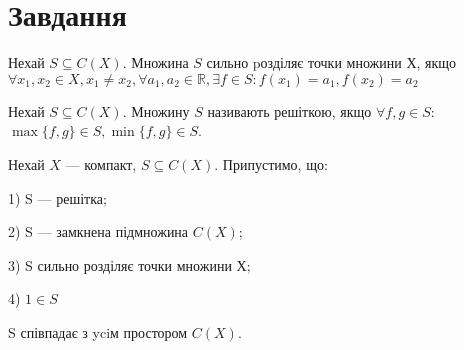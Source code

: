 \chapter{Завдання \theHchapter}

\begin{tcolorbox}[title=Означення 1]
    Нехай $S \subseteq C(X)$. 
    Множина $S$ сильно pозділяє точки множини $Х$, якщо
    $\forall x_1, x_2 \in X, x_1 \neq x_2, \forall a_1, a_2 \in \mathbb{R},
    \exists f \in S: f(x_1) = a_1, f(x_2) = a_2$
\end{tcolorbox}

\begin{tcolorbox}[title=Означення 2]
    Нехай $S \subseteq C(X)$. Множину $S$ називають решіткою, 
    якщо $\forall f, g \in S$:
    $\max\{f,g\} \in S, \min\{f,g\} \in S$.
\end{tcolorbox}


\begin{tcolorbox}[title=теорема Какутанi–Крейна.]
    Нехай $X$ — компакт, $S \subseteq C(X)$. Припустимо, що:


    1) S — решітка;
    
    
    2) S — замкнена підмножина $C(X)$;
    
    
    3) S сильно розділяє точки множини Х;
    
    
    4) $1 \in S$
    
    
    S співпадає з yciм простором $C(X)$.
\end{tcolorbox}

